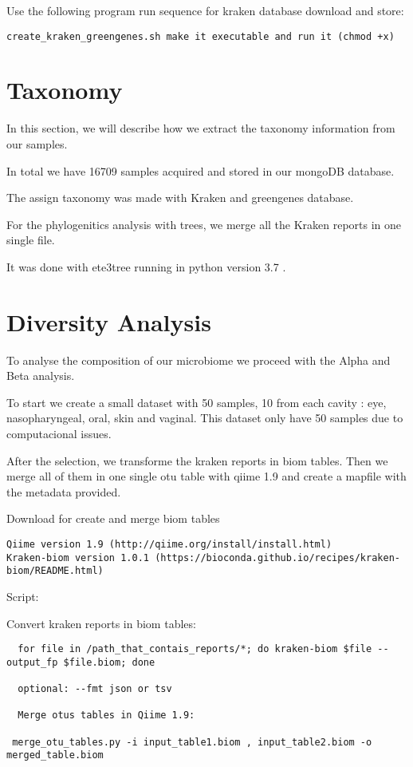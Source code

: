 \documentclass[]{article}
\begin{document}
Use the following program run sequence for kraken database download and
store:

\begin{verbatim}
create_kraken_greengenes.sh make it executable and run it (chmod +x)
\end{verbatim}

\hypertarget{taxonomy}{%
\section{Taxonomy}\label{taxonomy}}

In this section, we will describe how we extract the taxonomy
information from our samples.

In total we have 16709 samples acquired and stored in our mongoDB
database.

The assign taxonomy was made with Kraken and greengenes database.

For the phylogenitics analysis with trees, we merge all the Kraken
reports in one single file.

It was done with ete3tree running in python version 3.7 .

\hypertarget{diversity-analysis}{%
\section{Diversity Analysis}\label{diversity-analysis}}

To analyse the composition of our microbiome we proceed with the Alpha
and Beta analysis.

To start we create a small dataset with 50 samples, 10 from each cavity
: eye, nasopharyngeal, oral, skin and vaginal. This dataset only have 50
samples due to computacional issues.

After the selection, we transforme the kraken reports in biom tables.
Then we merge all of them in one single otu table with qiime 1.9 and
create a mapfile with the metadata provided.

Download for create and merge biom tables

\begin{verbatim}
Qiime version 1.9 (http://qiime.org/install/install.html)
Kraken-biom version 1.0.1 (https://bioconda.github.io/recipes/kraken-biom/README.html)
\end{verbatim}

Script:

Convert kraken reports in biom tables:

\begin{verbatim}
  for file in /path_that_contais_reports/*; do kraken-biom $file --output_fp $file.biom; done

  optional: --fmt json or tsv

  Merge otus tables in Qiime 1.9:

 merge_otu_tables.py -i input_table1.biom , input_table2.biom -o merged_table.biom
\end{verbatim}
\end{document}
